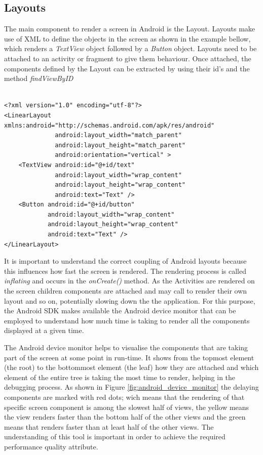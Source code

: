 \subsection{Layouts}
The main component to render a screen in Android is the Layout. Layouts make use of XML to define the objects in the screen as shown in the example bellow, which renders a \textit{TextView} object followed by a \textit{Button} object. Layouts need to be attached to an activity or fragment to give them behaviour. Once attached, the components defined by the Layout can be extracted by using their id's and the method \textit{findViewByID}
\begin{verbatim}

<?xml version="1.0" encoding="utf-8"?>
<LinearLayout xmlns:android="http://schemas.android.com/apk/res/android"
              android:layout_width="match_parent"
              android:layout_height="match_parent"
              android:orientation="vertical" >
    <TextView android:id="@+id/text"
              android:layout_width="wrap_content"
              android:layout_height="wrap_content"
              android:text="Text" />
    <Button android:id="@+id/button"
            android:layout_width="wrap_content"
            android:layout_height="wrap_content"
            android:text="Text" />
</LinearLayout>
\end{verbatim}

It is important to understand the correct coupling of Android layouts because this influences how fast the screen is rendered. The rendering process is called \textit{inflating} and occurs in the \textit{onCreate()} method. As the Activities are rendered on the screen children components are attached and may call to render their own layout and so on, potentially slowing down the the application. For this purpose, the Android SDK makes available the Android device monitor that can be employed to understand how much time is taking to render all the components displayed at a given time. 

The Android device monitor helps to visualise the components that are taking part of the screen at some point in run-time. It shows from the topmost element (the root) to the bottommost element (the leaf) how they are attached and which element of the entire tree is taking the most time to render, helping in the debugging process. As shown in Figure \ref{fig:android_device_monitor} the delaying components are marked with red dots; wich means that the rendering of that specific screen component is among the slowest half of views, the yellow means the view renders faster than the bottom half of the other views and the green means that renders faster than at least half of the other views. The understanding of this tool is important in order to achieve the required performance quality attribute. 

